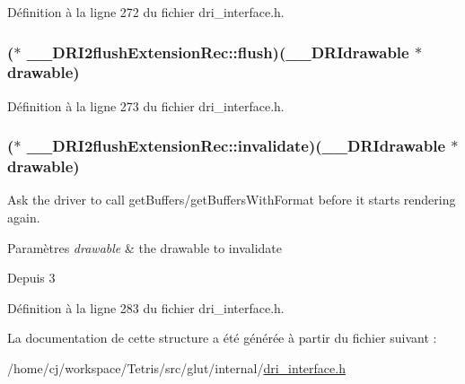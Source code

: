 Définition à la ligne 272 du fichier dri\-\_\-interface.\-h.

\hypertarget{struct_____d_r_i2flush_extension_rec_a226b837f3645d46c2cb12ba080f98fca}{
\subsubsection[{flush}]{($\ast$ \-\_\-\-\_\-\-D\-R\-I2flush\-Extension\-Rec\-::flush)({\bf \-\_\-\-\_\-\-D\-R\-Idrawable} $\ast$drawable)}}\label{struct_____d_r_i2flush_extension_rec_a226b837f3645d46c2cb12ba080f98fca}


Définition à la ligne 273 du fichier dri\-\_\-interface.\-h.

\hypertarget{struct_____d_r_i2flush_extension_rec_a6585c319bc0cf13666d08f85c1d2e7c0}{
\subsubsection[{invalidate}]{($\ast$ \-\_\-\-\_\-\-D\-R\-I2flush\-Extension\-Rec\-::invalidate)({\bf \-\_\-\-\_\-\-D\-R\-Idrawable} $\ast$drawable)}}\label{struct_____d_r_i2flush_extension_rec_a6585c319bc0cf13666d08f85c1d2e7c0}
Ask the driver to call get\-Buffers/get\-Buffers\-With\-Format before it starts rendering again.


\begin{DoxyParams}{Paramètres}
{\em drawable} & the drawable to invalidate\\
\hline
\end{DoxyParams}
\begin{DoxySince}{Depuis}
3 
\end{DoxySince}


Définition à la ligne 283 du fichier dri\-\_\-interface.\-h.



La documentation de cette structure a été générée à partir du fichier suivant \-:\begin{DoxyCompactItemize}
\item 
/home/cj/workspace/\-Tetris/src/glut/internal/\hyperlink{dri__interface_8h}{dri\-\_\-interface.\-h}\end{DoxyCompactItemize}
